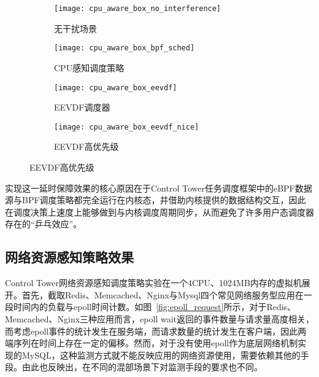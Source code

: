 \begin{figure}[H]
    \centering
    \begin{subfigure}[b]{0.35\textwidth}
        \texttt{[image: cpu\_aware\_box\_no\_interference]}
        \caption{无干扰场景}
        \label{fig:cpu_aware_box_no_interference}
    \end{subfigure}
    \begin{subfigure}[b]{0.35\textwidth}
        \texttt{[image: cpu\_aware\_box\_bpf\_sched]}
        \caption{CPU感知调度策略}
        \label{fig:cpu_aware_box_bpf_sched}
    \end{subfigure}
    \begin{subfigure}[b]{0.35\textwidth}
        \texttt{[image: cpu\_aware\_box\_eevdf]}
        \caption{EEVDF调度器}
        \label{fig:cpu_aware_box_eevdf}
    \end{subfigure}
    \begin{subfigure}[b]{0.35\textwidth}
        \texttt{[image: cpu\_aware\_box\_eevdf\_nice]}
        \caption{EEVDF高优先级}
        \label{fig:cpu_aware_box_eevdf_nice}
    \end{subfigure}
\label{fig:latency_box}
\end{figure}

实现这一延时保障效果的核心原因在于Control Tower任务调度框架中的eBPF数据源与BPF调度策略都完全运行在内核态，并借助内核提供的数据结构交互，因此在调度决策上速度上能够做到与内核调度周期同步，从而避免了许多用户态调度器存在的“乒乓效应”。

\subsection{网络资源感知策略效果}

Control Tower网络资源感知调度策略实验在一个4CPU、1024MB内存的虚拟机展开。首先，截取Redis、Memcached、Nginx与Mysql四个常见网络服务型应用在一段时间内的负载与epoll时间计数。如图~\ref{fig:epoll_request}所示，对于Redis、Memcached、Nginx三种应用而言，epoll wait返回的事件数量与请求量高度相关，而考虑epoll事件的统计发生在服务端，而请求数量的统计发生在客户端，因此两端序列在时间上存在一定的偏移。然而，对于没有使用epoll作为底层网络机制实现的MySQL，这种监测方式就不能反映应用的网络资源使用，需要依赖其他的手段。由此也反映出，在不同的混部场景下对监测手段的要求也不同。

